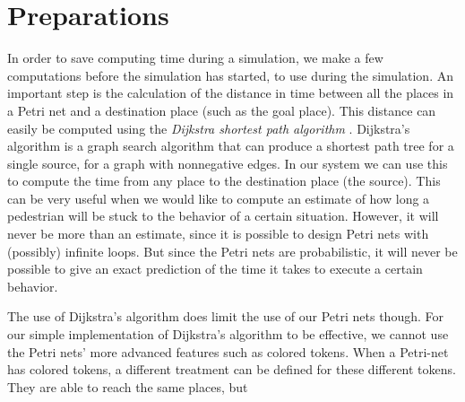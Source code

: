 \documentclass[11pt, a4paper]{book}
\begin{document}
\section{Preparations}
In order to save computing time during a simulation, we make a few computations before the simulation has started, to use during the simulation. An important step is the calculation of the distance in time between all the places in a Petri net and a destination place (such as the goal place). This distance can easily be computed using the \emph{Dijkstra shortest path algorithm} \cite{dijkstra}. Dijkstra's algorithm is a graph search algorithm that can produce a shortest path tree for a single source, for a graph with nonnegative edges. In our system we can use this to compute the time from any place to the destination place (the source). This can be very useful when we would like to compute an estimate of how long a pedestrian will be stuck to the behavior of a certain situation. However, it will never be more than an estimate, since it is possible to design Petri nets with (possibly) infinite loops. But since the Petri nets are probabilistic, it will never be possible to give an exact prediction of the time it takes to execute a certain behavior.

The use of Dijkstra's algorithm does limit the use of our Petri nets though. For our simple implementation of Dijkstra's algorithm to be effective, we cannot use the Petri nets' more advanced features such as colored tokens. When a Petri-net has colored tokens, a different treatment can be defined for these different tokens. They are able to reach the same places, but 

\end{document}
